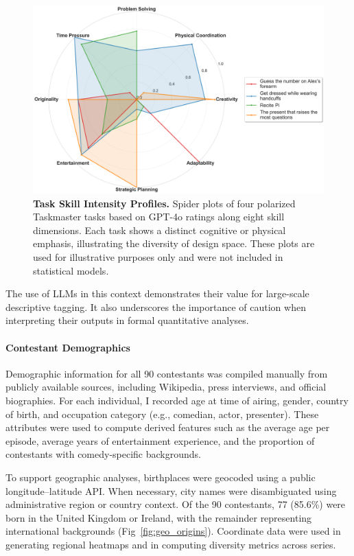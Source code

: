 \documentclass[10pt,letterpaper]{article}
\begin{document}
\begin{figure}[!h]
\centering
\includegraphics[width=\linewidth]{figures/main/Fig3.png}
\caption{{\bf Task Skill Intensity Profiles.}
Spider plots of four polarized Taskmaster tasks based on GPT-4o ratings along eight skill dimensions. Each task shows a distinct cognitive or physical emphasis, illustrating the diversity of design space. These plots are used for illustrative purposes only and were not included in statistical models.}
\label{fig:task_skills}
\end{figure}
\FloatBarrier

The use of LLMs in this context demonstrates their value for large-scale descriptive tagging. It also underscores the importance of caution when interpreting their outputs in formal quantitative analyses.

\paragraph{Contestant Demographics}
Demographic information for all 90 contestants was compiled manually from publicly available sources, including Wikipedia, press interviews, and official biographies. For each individual, I recorded age at time of airing, gender, country of birth, and occupation category (e.g., comedian, actor, presenter). These attributes were used to compute derived features such as the average age per episode, average years of entertainment experience, and the proportion of contestants with comedy-specific backgrounds.

To support geographic analyses, birthplaces were geocoded using a public longitude–latitude API. When necessary, city names were disambiguated using administrative region or country context. Of the 90 contestants, 77 (85.6\%) were born in the United Kingdom or Ireland, with the remainder representing international backgrounds (Fig~\ref{fig:geo_origins}). Coordinate data were used in generating regional heatmaps and in computing diversity metrics across series.
\end{document}
